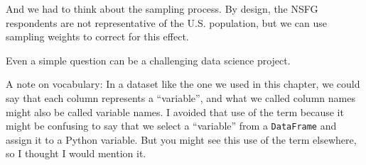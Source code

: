 And we had to think about the sampling process. By design, the NSFG
respondents are not representative of the U.S. population, but we can
use sampling weights to correct for this effect.

Even a simple question can be a challenging data science project.

A note on vocabulary: In a dataset like the one we used in this chapter,
we could say that each column represents a ``variable'', and what we
called column names might also be called variable names. I avoided that
use of the term because it might be confusing to say that we select a
``variable'' from a \passthrough{\lstinline!DataFrame!} and assign it to
a Python variable. But you might see this use of the term elsewhere, so
I thought I would mention it.

